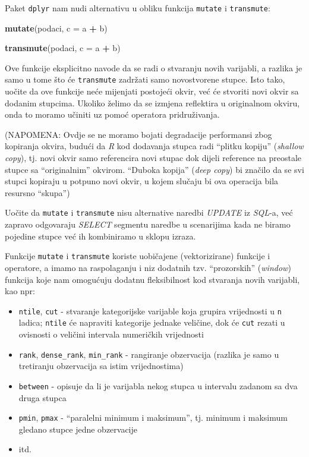 \documentclass[]{book}
\newenvironment{Shaded}{\begin{snugshade}}{\end{snugshade}}
\newcommand{\KeywordTok}[1]{\textcolor[rgb]{0.13,0.29,0.53}{\textbf{#1}}}
\newcommand{\DataTypeTok}[1]{\textcolor[rgb]{0.13,0.29,0.53}{#1}}
\newcommand{\StringTok}[1]{\textcolor[rgb]{0.31,0.60,0.02}{#1}}
\newcommand{\OperatorTok}[1]{\textcolor[rgb]{0.81,0.36,0.00}{\textbf{#1}}}
\newcommand{\NormalTok}[1]{#1}
\providecommand{\tightlist}{%
  \setlength{\itemsep}{0pt}\setlength{\parskip}{0pt}}
\theoremstyle{definition}
\theoremstyle{definition}
\theoremstyle{definition}
\theoremstyle{remark}
\begin{document}
Paket \texttt{dplyr} nam nudi alternativu u obliku funkcija
\texttt{mutate} i \texttt{transmute}:

\begin{Shaded}
\begin{Highlighting}[]
\KeywordTok{mutate}\NormalTok{(podaci, }\DataTypeTok{c =}\NormalTok{ a }\OperatorTok{+}\StringTok{ }\NormalTok{b)}

\KeywordTok{transmute}\NormalTok{(podaci, }\DataTypeTok{c =}\NormalTok{ a }\OperatorTok{+}\StringTok{ }\NormalTok{b)}
\end{Highlighting}
\end{Shaded}

Ove funkcije eksplicitno navode da se radi o stvaranju novih varijabli,
a razlika je samo u tome što će \texttt{transmute} zadržati samo
novostvorene stupce. Isto tako, uočite da ove funkcije neće mijenjati
postojeći okvir, već će stvoriti novi okvir sa dodanim stupcima. Ukoliko
želimo da se izmjena reflektira u originalnom okviru, onda to moramo
učiniti uz pomoć operatora pridruživanja.

(NAPOMENA: Ovdje se ne moramo bojati degradacije performansi zbog
kopiranja okvira, budući da \emph{R} kod dodavanja stupca radi ``plitku
kopiju'' (\emph{shallow copy}), tj. novi okvir samo referencira novi
stupac dok dijeli reference na preostale stupce sa ``originalnim''
okvirom. ``Duboka kopija'' (\emph{deep copy}) bi značilo da se svi
stupci kopiraju u potpuno novi okvir, u kojem slučaju bi ova operacija
bila resursno ``skupa'')

Uočite da \texttt{mutate} i \texttt{transmute} nisu alternative naredbi
\emph{UPDATE} iz \emph{SQL}-a, već zapravo odgovaraju \emph{SELECT}
segmentu naredbe u scenarijima kada ne biramo pojedine stupce već ih
kombiniramo u sklopu izraza.

Funkcije \texttt{mutate} i \texttt{transmute} koriste uobičajene
(vektorizirane) funkcije i operatore, a imamo na raspolaganju i niz
dodatnih tzv. ``prozorskih'' (\emph{window}) funkcija koje nam omogućuju
dodatnu fleksibilnost kod stvaranja novih varijabli, kao npr:

\begin{itemize}
\tightlist
\item
  \texttt{ntile}, \texttt{cut} - stvaranje kategorijske varijable koja
  grupira vrijednosti u \texttt{n} ladica; \texttt{ntile} će napraviti
  kategorije jednake veličine, dok će \texttt{cut} rezati u ovisnosti o
  veličini intervala numeričkih vrijednosti
\item
  \texttt{rank}, \texttt{dense\_rank}, \texttt{min\_rank} - rangiranje
  obzervacija (razlika je samo u tretiranju obzervacija sa istim
  vrijednostima)
\item
  \texttt{between} - opisuje da li je varijabla nekog stupca u intervalu
  zadanom sa dva druga stupca
\item
  \texttt{pmin}, \texttt{pmax} - ``paralelni minimum i maksimum'', tj.
  minimum i maksimum gledano stupce jedne obzervacije
\item
  itd.
\end{itemize}
\end{document}
